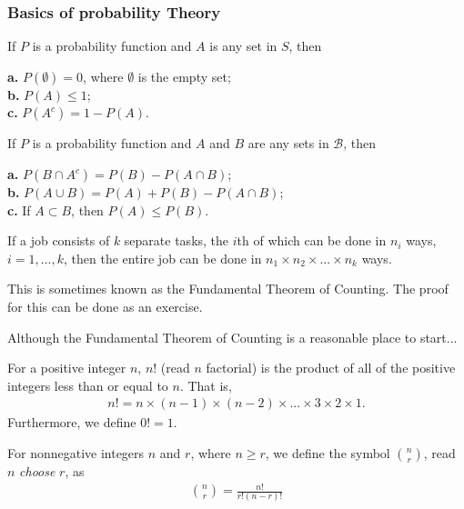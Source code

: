 \subsubsection{Basics of probability Theory}

\begin{thm}
    If $P$ is a probability function and $A$ is any set in $S$, then

    \textbf{a.} $P(\emptyset) = 0$, where $\emptyset$ is the empty set; \\
    \textbf{b.} $P(A) \leq 1$; \\
    \textbf{c.} $P(A^c) = 1 - P(A)$.
\end{thm}
\begin{thm}
    If $P$ is a probability function and $A$ and $B$ are any sets in $\mathcal{B}$, then

    \textbf{a.} $P(B \cap A^c) = P(B) - P(A \cap B)$; \\
    \textbf{b.} $P(A \cup B) = P(A) + P(B) - P(A \cap B)$; \\
    \textbf{c.} If $A \subset B$, then $P(A) \leq P(B)$.
\end{thm}
\begin{thm}
    If a job consists of $k$ separate tasks, the $i$th of which can be done in $n_i$ ways, $i = 1, ..., k$, then the entire job can be done in $n_1 \times n_2 \times ... \times n_k$ ways.
\end{thm}
This is sometimes known as the Fundamental Theorem of Counting. The proof for this can be done as an exercise.
\begin{exmp}[Lottery - II]
    Although the Fundamental Theorem of Counting is a reasonable place to start...
\end{exmp}
\begin{defn}
    For a positive integer $n$, $n!$ (read $n$ factorial) is the product of all of the positive integers less than or equal to $n$. That is,
    \begin{align*}
        n! = n \times (n - 1) \times (n - 2) \times ... \times 3 \times 2 \times 1.
    \end{align*}
    Furthermore, we define $0! = 1$.
\end{defn}
\begin{defn}
    For nonnegative integers $n$ and $r$, where $n \geq r$, we define the symbol $\binom{n}{r}$, read $n$ \textit{choose} $r$, as
    \begin{align*}
        \binom{n}{r} = \frac{n!}{r!(n - r)!}
    \end{align*}
\end{defn}

